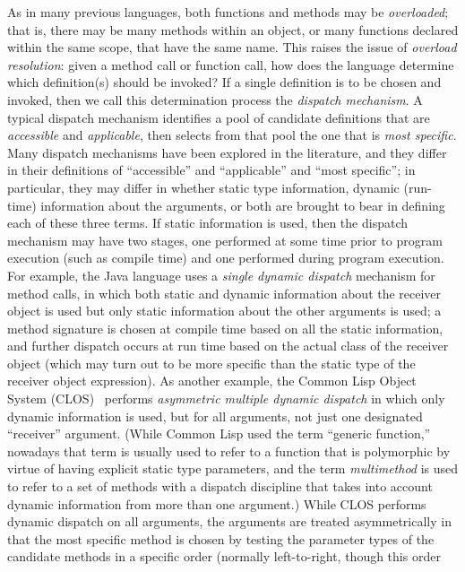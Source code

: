As in many previous languages, both functions and methods may be
\emph{overloaded}; that is, there may be many methods within an
object, or many functions declared within the same scope, that have
the same name.  This raises the issue of \emph{overload resolution}:
given a method call or function call, how does the language determine
which definition(s) should be invoked?  If a single
definition is to be chosen and invoked, then we call this determination
process the \emph{dispatch mechanism}.  A typical dispatch mechanism
identifies a pool of candidate definitions that are \emph{accessible}
and \emph{applicable}, then selects from that pool the one that is
\emph{most specific}.  Many dispatch mechanisms have
been explored in the literature, and they differ in their definitions
of ``accessible'' and ``applicable'' and ``most specific'';
in particular, they may differ in whether static type information,
dynamic (run-time) information about the arguments, or both are
brought to bear in defining each of these three terms.
If static information is used, then the dispatch mechanism may
have two stages, one performed at some time prior to program
execution (such as compile time) and one performed during program
execution.
For example, the Java language uses a \emph{single dynamic dispatch} mechanism
for method calls,
in which both static and dynamic information about the receiver
object is used but only static information about the other arguments
is used; a method signature is chosen at compile time based on all
the static information, and further dispatch occurs at run time
based on the actual class of the receiver object (which may turn out to be
more specific than the static type of the receiver object expression).
As another example, the Common Lisp Object System (CLOS)~\cite{ECOOP87-CLOS,CLOS-SPECIFICATION,CLTL2,CACM-CLOS}
performs \emph{asymmetric multiple dynamic dispatch}
in which only dynamic information is used, but for all arguments,
not just one designated ``receiver'' argument.
(While Common Lisp used the term ``generic function,'' nowadays
that term is usually used to refer to a function that is polymorphic
by virtue of having explicit static type parameters, and
the term \emph{multimethod} is used to refer to a set of methods
with a dispatch discipline that takes into account dynamic information
from more than one argument.)
While CLOS performs dynamic dispatch on all arguments,
the arguments are treated asymmetrically in that the most specific
method is chosen by testing the parameter types of the candidate
methods in a specific order (normally left-to-right, though this order
